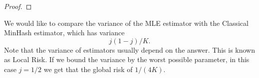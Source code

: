 \begin{proof}
\end{proof}


We would like to compare the variance of the MLE estimator with the Classical MinHash estimator, which has variance
\[
   j(1-j)/K.
   \label{eq:minvar}
\]
Note that the variance of estimators usually depend on the answer.
This is known as Local Risk.
If we bound the variance by the worst possible parameter, in this case $j=1/2$ we get that the global risk of $1/(4K)$.

